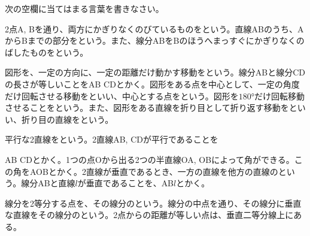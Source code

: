 \documentclass[
  14pt,a4paper,lualatex,ja=standard]{bxjsarticle}
\begin{document}
\newcommand{\myarc}[1]{
   \tikz [baseline = (N.base), every node/.style={}] {
      \node [inner sep = 0pt] (N) {$\mathrm{#1}$};
      \draw [line width = 0.4pt] plot [smooth, tension=1.3] coordinates {
         ($(N.north west) + (0.1ex,0)$)
         ($(N.north)      + (0,0.5ex)$)
         ($(N.north east) + (0,0)$)
      };
   }
}

\makeatletter
\newenvironment{figurehere}{\def\@captype{figure}}{}
\makeatother

\newcommand{\haiten}[1]{%
\begin{flushright}%
\footnotesize{＜#1＞}%
\end{flushright}%
}

\newcommand{\goku}[1]{\fbox{\phantom{\text{#1}} \quad}}


\noindent{} \hspace{1pt} 次の空欄に当てはまる言葉を書きなさい。

2点A,
Bを通り、両方にかぎりなくのびているものをという。直線ABのうち、AからBまでの部分をという。また、線分ABをBのほうへまっすぐにかぎりなくのばしたものをという。

図形を、一定の方向に、一定の距離だけ動かす移動をという。線分ABと線分CDの長さが等しいことをAB
\fbox{\phantom{\text{$=$}} \quad}
CDとかく。図形をある点を中心として、一定の角度だけ回転させる移動をといい、中心とする点をという。図形を\(\ang{180}\)だけ回転移動させることをという。また、図形をある直線を折り目として折り返す移動をといい、折り目の直線をという。

平行な2直線をという。2直線AB,
CDが平行であることを

\noindent AB \fbox{\phantom{\text{$/\!/$}} \quad}
CDとかく。1つの点Oから出る2つの半直線OA,
OBによって角ができる。この角を\fbox{\phantom{\text{$\angle$}} \quad}AOBとかく。2直線が垂直であるとき、一方の直線を他方の直線のという。線分ABと直線\(l\)が垂直であることを、AB\fbox{\phantom{\text{$\perp$}} \quad}\(l\)とかく。

線分を2等分する点を、その線分のという。線分の中点を通り、その線分に垂直な直線をその線分のという。2点からの距離が等しい点は、垂直二等分線上にある。
\end{document}
